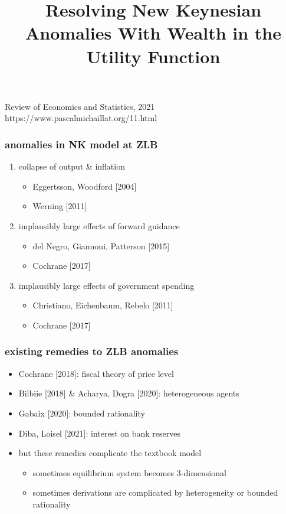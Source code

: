 \documentclass[12pt,xcolor={dvipsnames},hyperref={pdftex,pdfpagemode=UseNone,hidelinks,pdfdisplaydoctitle=true},usepdftitle=false]{beamer}
\begin{document}
\title{Resolving New Keynesian Anomalies With Wealth in the Utility Function}
%
{Review of Economics and Statistics, 2021}%
{https://www.pascalmichaillat.org/11.html}
\frame[plain]{\titlepage}

\begin{frame}
\frametitle{anomalies in NK model at ZLB}
\begin{enumerate}
\item collapse of output \& inflation
\begin{itemize}
\item Eggertsson, Woodford [2004]
\item Werning [2011]
\end{itemize}
\item implausibly large effects of forward guidance
\begin{itemize}
\item del Negro, Giannoni, Patterson [2015]
\item Cochrane [2017]
\end{itemize}
\item implausibly large effects of government spending
\begin{itemize}
\item Christiano, Eichenbaum, Rebelo [2011]
\item Cochrane [2017]
\end{itemize}
\end{enumerate}
\end{frame}

\begin{frame}
\frametitle{existing remedies to ZLB anomalies}
\begin{itemize}
	\item Cochrane [2018]: fiscal theory of price level
	\item Bilbiie [2018] \& Acharya, Dogra [2020]: heterogeneous agents
  \item Gabaix [2020]: bounded rationality
	\item Diba, Loisel [2021]: interest on bank reserves
	\item but these remedies complicate the textbook model
	\begin{itemize}
	\item sometimes equilibrium system becomes 3-dimensional
	\item sometimes derivations are complicated by heterogeneity or bounded rationality
	\end{itemize}
\end{itemize}
\end{frame}
\end{document}

